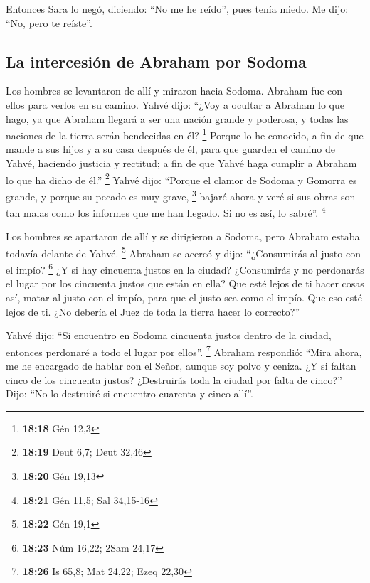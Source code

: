  Entonces Sara lo negó, diciendo: ``No me he reído'',
pues tenía miedo. Me dijo: ``No, pero te reíste''.

\hypertarget{la-intercesiuxf3n-de-abraham-por-sodoma}{%
\subsection{La intercesión de Abraham por
Sodoma}\label{la-intercesiuxf3n-de-abraham-por-sodoma}}

 Los hombres se levantaron de allí y miraron hacia
Sodoma. Abraham fue con ellos para verlos en su camino. 
Yahvé dijo: ``¿Voy a ocultar a Abraham lo que hago,  ya
que Abraham llegará a ser una nación grande y poderosa, y todas las
naciones de la tierra serán bendecidas en él? \footnote{\textbf{18:18}
  Gén 12,3}  Porque lo he conocido, a fin de que mande a
sus hijos y a su casa después de él, para que guarden el camino de
Yahvé, haciendo justicia y rectitud; a fin de que Yahvé haga cumplir a
Abraham lo que ha dicho de él.'' \footnote{\textbf{18:19} Deut 6,7; Deut
  32,46}  Yahvé dijo: ``Porque el clamor de Sodoma y
Gomorra es grande, y porque su pecado es muy grave, \footnote{\textbf{18:20}
  Gén 19,13}  bajaré ahora y veré si sus obras son tan
malas como los informes que me han llegado. Si no es así, lo sabré''.
\footnote{\textbf{18:21} Gén 11,5; Sal 34,15-16}

 Los hombres se apartaron de allí y se dirigieron a
Sodoma, pero Abraham estaba todavía delante de Yahvé. \footnote{\textbf{18:22}
  Gén 19,1}  Abraham se acercó y dijo: ``¿Consumirás al
justo con el impío? \footnote{\textbf{18:23} Núm 16,22; 2Sam 24,17}
 ¿Y si hay cincuenta justos en la ciudad? ¿Consumirás y
no perdonarás el lugar por los cincuenta justos que están en ella?
 Que esté lejos de ti hacer cosas así, matar al justo con
el impío, para que el justo sea como el impío. Que eso esté lejos de ti.
¿No debería el Juez de toda la tierra hacer lo correcto?''

 Yahvé dijo: ``Si encuentro en Sodoma cincuenta justos
dentro de la ciudad, entonces perdonaré a todo el lugar por ellos''.
\footnote{\textbf{18:26} Is 65,8; Mat 24,22; Ezeq 22,30} 
Abraham respondió: ``Mira ahora, me he encargado de hablar con el Señor,
aunque soy polvo y ceniza.  ¿Y si faltan cinco de los
cincuenta justos? ¿Destruirás toda la ciudad por falta de cinco?'' Dijo:
``No lo destruiré si encuentro cuarenta y cinco allí''.

